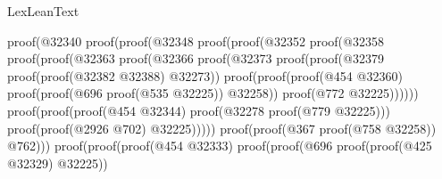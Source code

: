 \begin{lexlean}{LexLeanText}
\begin{coremodule}
                                              proof(@32340
                                                  proof(proof(@32348
                                                        proof(proof(@32352
                                                              proof(@32358
                                                                  proof(proof(@32363
                                                                        proof(@32366
                                                                            proof(@32373
                                                                                proof(proof(@32379
                                                                                      proof(proof(@32382
                                                                                            @32388)
                                                                                          @32273))
                                                                                    proof(proof(proof(@454
                                                                                            @32360)
                                                                                          proof(proof(@696
                                                                                                proof(@535
                                                                                                    @32225))
                                                                                              @32258))
                                                                                        proof(@772
                                                                                            @32225))))))
                                                                      proof(proof(proof(@454 @32344)
                                                                            proof(@32278
                                                                                proof(@779 @32225)))
                                                                          proof(proof(@2926 @702)
                                                                              @32225)))))
                                                            proof(proof(@367 proof(@758 @32258))
                                                                @762)))
                                                      proof(proof(proof(@454 @32333)
                                                            proof(proof(@696
                                                                  proof(proof(@425 @32329) @32225))

\end{coremodule}
\end{lexlean}

